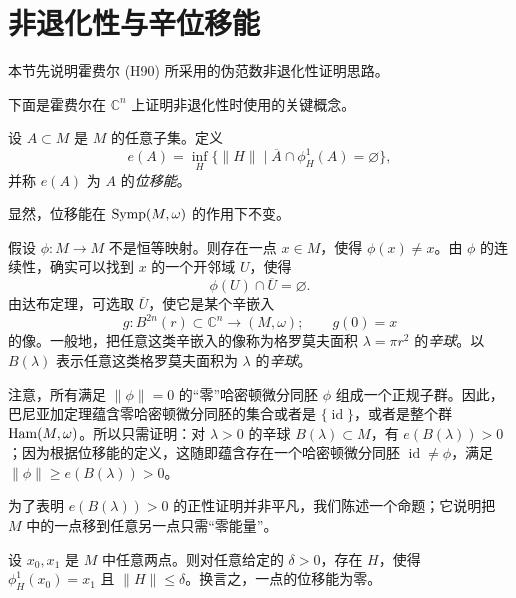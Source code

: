 \section{非退化性与辛位移能}
\label{sec:nondegeneracy-displacement-energy}

本节先说明霍费尔 (H90) 所采用的伪范数非退化性证明思路。

下面是霍费尔在 $\mathbb C^n$ 上证明非退化性时使用的关键概念。

\begin{definition}[位移能]\label{def:displacement-energy}
设 $A\subset M$ 是 $M$ 的任意子集。定义
\begin{equation}
 e(A)=\inf_H\{\|H\|\mid
   \overline A\cap\phi_H^1(A)=\varnothing\},
 \label{eq:displacement-energy}
\end{equation}
并称 $e(A)$ 为 $A$ 的\emph{位移能}。
\end{definition}

显然，位移能在 $\operatorname{Symp}(M,\omega)$ 的作用下不变。

假设 $\phi:M\to M$ 不是恒等映射。则存在一点 $x\in M$，使得
$\phi(x)\ne x$。由 $\phi$ 的连续性，确实可以找到 $x$ 的一个开邻域
$U$，使得
\[
 \phi(U)\cap\overline U=\varnothing.
\]
由达布定理，可选取 $\overline U$，使它是某个辛嵌入
\[
 g:B^{2n}(r)\subset\mathbb C^n\longrightarrow(M,\omega);
 \qquad g(0)=x
\]
的像。一般地，把任意这类辛嵌入的像称为格罗莫夫面积
$\lambda=\pi r^2$ 的\emph{辛球}。以 $B(\lambda)$ 表示任意这类格罗莫夫面积为 $\lambda$ 的\emph{辛球}。

注意，所有满足 $\|\phi\|=0$ 的“零”哈密顿微分同胚 $\phi$ 组成一个正规子群。因此，巴尼亚加定理蕴含零哈密顿微分同胚的集合或者是
$\{\operatorname{id}\}$，或者是整个群 $\operatorname{Ham}(M,\omega)$。所以只需证明：对
$\lambda>0$ 的辛球 $B(\lambda)\subset M$，有 $e(B(\lambda))>0$；因为根据位移能的定义，这随即蕴含存在一个哈密顿微分同胚
$\operatorname{id}\ne\phi$，满足
$\|\phi\|\geq e(B(\lambda))>0$。

为了表明 $e(B(\lambda))>0$ 的正性证明并非平凡，我们陈述一个命题；它说明把 $M$ 中的一点移到任意另一点只需“零能量”。

\begin{proposition}\label{prop:point-zero-displacement-energy}
设 $x_0,x_1$ 是 $M$ 中任意两点。则对任意给定的 $\delta>0$，存在
$H$，使得 $\phi_H^1(x_0)=x_1$ 且 $\|H\|\leq\delta$。换言之，一点的位移能为零。
\end{proposition}

